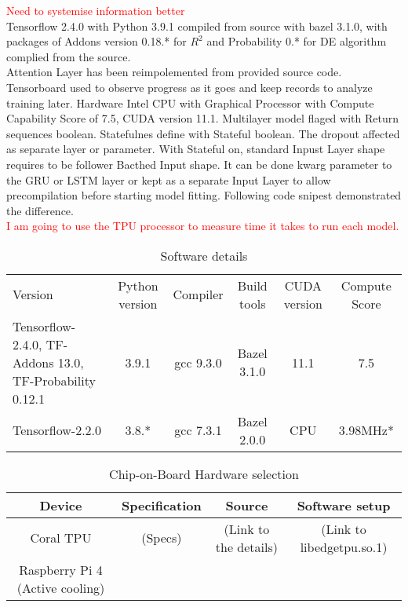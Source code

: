 \textcolor{red}{Need to systemise information better} \\
Tensorflow 2.4.0 with Python 3.9.1 compiled from source with bazel 3.1.0, with packages of Addons version 0.18.* for $R^2$ and Probability 0.* for DE algorithm complied from the source. \\
Attention Layer has been reimpolemented from provided source code.%
Tensorboard used to observe progress as it goes and keep records to analyze training later.
Hardware Intel CPU with Graphical Processor with Compute Capability Score of 7.5, CUDA version 11.1.
Multilayer model flaged with Return sequences boolean. Statefulnes define with Stateful boolean. The dropout affected as separate layer or parameter. With Stateful on, standard Inpust Layer shape requires to be follower Bacthed Input shape. It can be done kwarg parameter to the GRU or LSTM layer or kept as a separate Input Layer to allow precompilation before starting model fitting. Following code snipest demonstrated the difference. \\
\textcolor{red}{I am going to use the TPU processor to measure time it takes to run each model.} \\
\begin{table}[ht]
    \centering
    \caption{Software details}
    \label{tab:my_label}
    \begin{tabular}{p{3.0cm}|c|c|c|c|c}
        Version & Python version & Compiler & Build tools & CUDA version & Compute Score\\
        Tensorflow-2.4.0, TF-Addons 13.0, TF-Probability 0.12.1 & 3.9.1 & gcc 9.3.0 & Bazel 3.1.0 & 11.1 & 7.5\\
        \hline
        Tensorflow-2.2.0 & 3.8.* & gcc 7.3.1 & Bazel 2.0.0 & CPU & 3.98MHz*
    \end{tabular}
\end{table}
\begin{table}[]
    \centering
    \caption{Chip-on-Board Hardware selection}
    \label{tab:my_label}
    \begin{tabular}{c|c|c|c}
        Device & Specification & Source & Software setup \\
        \hline
        Coral TPU & (Specs) & (Link to the details) & (Link to libedgetpu.so.1) \\
        \hline
        Raspberry Pi 4 (Active cooling) & 
    \end{tabular}
\end{table}